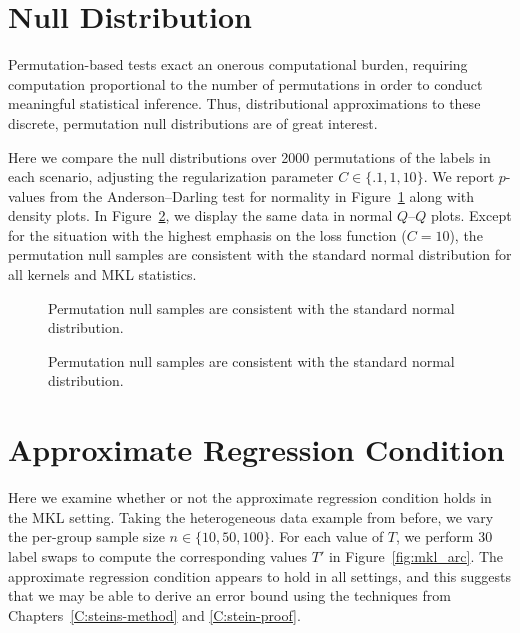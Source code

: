 \section{Null Distribution}
Permutation-based tests exact an onerous computational burden, requiring computation
proportional to the number of permutations in order to conduct meaningful statistical
inference.  Thus, distributional approximations to these discrete, permutation null
distributions are of great interest.

Here we compare the null distributions over 2000 permutations of the
labels in each scenario, adjusting the regularization parameter $C \in
\{.1, 1, 10\}$.  We report $p$-values from the Anderson--Darling test
for normality in Figure~\ref{fig:mkl_null} along with density plots.
In Figure~\ref{fig:mkl_null_qq}, we display the same data in normal
$Q$--$Q$ plots.  Except for the situation with the highest emphasis on
the loss function ($C=10$), the permutation null samples are
consistent with the standard normal distribution for all kernels and
MKL statistics.
\begin{figure}
  \begin{center}
    \resizebox{14.0cm}{!}{
      
    }
  \end{center}
\caption{Permutation null samples are consistent with the standard normal distribution.}
\label{fig:mkl_null}
\end{figure}

\begin{figure}
  \begin{center}
    \resizebox{14.0cm}{!}{
      
    }
  \end{center}
\caption{Permutation null samples are consistent with the standard normal distribution.}
\label{fig:mkl_null_qq}
\end{figure}

\section{Approximate Regression Condition}
Here we examine whether or not the approximate regression condition
holds in the MKL setting.
Taking the heterogeneous data example from before, we vary the
per-group sample size $n \in \{10, 50, 100\}$.  For each value of $T$,
we perform $30$ label swaps to compute the corresponding values $T'$
in Figure~\ref{fig:mkl_arc}.  The approximate regression condition
appears to hold in all settings, and this suggests that we may be able to derive
an error bound using the techniques from
Chapters~\ref{C:steins-method} and \ref{C:stein-proof}.

